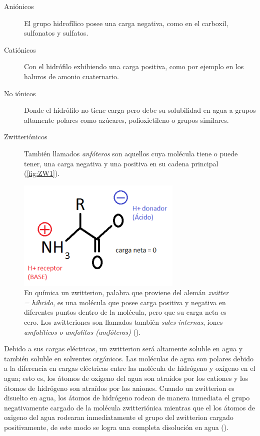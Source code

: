 \begin{description}
    \item[Aniónicos] El grupo hidrofílico posee una carga negativa, como en el carboxil, sulfonatos y sulfatos.
    \item[Catiónicos] Con el hidrófilo exhibiendo una carga positiva, como por ejemplo en los haluros de amonio cuaternario.
    \item[No iónicos] Donde el hidrófilo no tiene carga pero debe su solubilidad en agua a grupos altamente polares como azúcares, polioxietileno o grupos similares.
    \item[Zwitteriónicos] También llamados \emph{anfóteros} son aquellos cuya molécula tiene o puede tener, una carga negativa y una positiva en su cadena principal (\autoref{fig:ZW1}).
\end{description}



\begin{figure}
    \centering
    \includegraphics[width=0.7\textwidth]{Graphics/ZW3.png}
    \caption[Molécula zwitterion general]{En química un zwitterion, palabra que proviene del alemán \textit{zwitter = híbrido}, es una molécula que posee carga positiva y negativa en diferentes puntos dentro de la molécula, pero que su carga neta es cero. Los zwitteriones son llamados también \emph{sales internas}, iones \textit{amfolíticos o amfolitos (amfóteros)} (\cite{Dictionary:chem}).}
    \label{fig:ZW1}
\end{figure}

Debido a sus cargas eléctricas, un zwitterion será altamente soluble en agua y también soluble en solventes orgánicos. Las moléculas de agua son polares debido a la diferencia en cargas eléctricas entre las molécula de hidrógeno y oxígeno en el agua; esto es, los átomos de oxígeno del agua son atraídos por los cationes y los átomos de hidrógeno son atraídos por los aniones. Cuando un zwitterion es disuelto en agua, los átomos de hidrógeno rodean de manera inmediata el grupo negativamente cargado de la molécula zwitteriónica mientras que el los átomos de oxigeno del agua rodearan inmediatamente el grupo del zwitterion cargado positivamente, de este modo se logra una completa disolución en agua (\cite{Lenhinger:chem}).

